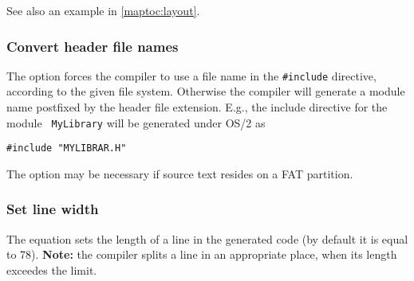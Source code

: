 See also an example in \ref{maptoc:layout}.

\subsubsection{Convert header file names}

The  option
forces the compiler   to  use a file  name  in  the  \verb|#include|
directive,  according  to  the  given  file system. Otherwise the
compiler  will  generate a module name postfixed by the header file
extension.   E.g.,  the  include  directive  for  the  module  {\tt
MyLibrary} will be generated under OS/2 as
\begin{verbatim}
#include "MYLIBRAR.H"
\end{verbatim}
The  option may be necessary if source text resides on a FAT partition.

\subsubsection{Set line width}

The  equation
sets  the  length  of a line in the generated code
(by default it is equal to 78).
{\bf  Note:} the compiler splits a line in an appropriate place,
when its length exceedes the limit.
